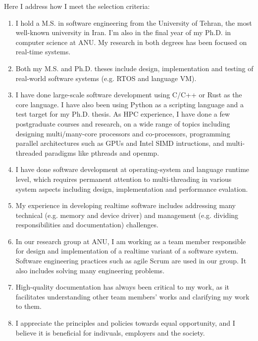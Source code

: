 \documentclass[11pt,a4paper,calibri]{moderncv}
\begin{document}
Here I address how I meet the selection criteria:
\vspace{0.2cm}
    \begin{enumerate}
        \item I hold a M.S. in software engineering from the University of Tehran, the most well-known university in Iran.
        I'm also in the final year of my Ph.D. in computer science at ANU.
        My research in both degrees has been focused on real-time systems.
        \item Both my M.S. and Ph.D. theses include design, implementation and testing of real-world software systems (e.g. RTOS and language VM).
        \item I have done large-scale software development using C/C++ or Rust as the core language. I have also been using Python as a scripting language and a test target for my Ph.D. thesis. As HPC experience, I have done a few postgraduate courses and research, on a wide range of topics including designing multi/many-core processors and co-processors, programming parallel architectures such as GPUs and Intel SIMD intructions, and multi-threaded paradigms like pthreads and openmp.
        \item I have done software development at operating-system and language runtime level, which requires permanent attention to multi-threading in various system aspects including design, implementation and performance evalation.
        \item My experience in developing realtime software includes addressing many technical (e.g. memory and device driver) and management (e.g. dividing responsibilities and documentation) challenges.
        \item In our research group at ANU, I am working as a team member responsible for design and implementation of a realtime variant of a software system. Software engineering practices such as agile Scrum are used in our group. It also includes solving many engineering problems.
        \item High-quality documentation has always been critical to my work, as it facilitates understanding other team members' works and clarifying my work to them.
        \item I appreciate the principles and policies towards equal opportunity, and I believe it is beneficial for indivuals, employers and the society.
    \end{enumerate}

\end{document}
